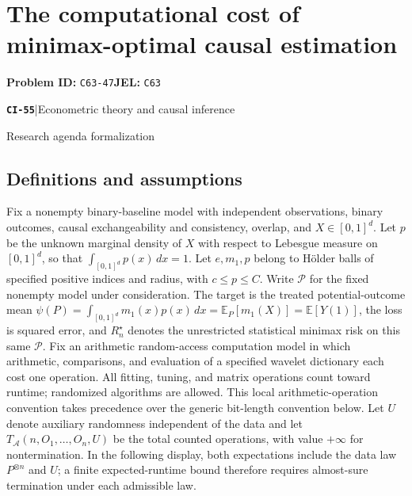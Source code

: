 \documentclass[11pt,a4paper]{article}
\newcommand{\E}{\mathbb E}
\newcommand{\entrymeta}[3]{{\sffamily\small\color{muted}\textbf{\texttt{#1}}\quad|\quad #2\par #3\par}}
\begin{document}
\section*{The computational cost of minimax-optimal causal estimation}
\textbf{Problem ID:} \texttt{C63-47}\quad \textbf{JEL:} \texttt{C63}\par
\label{problem:OP-0534}
\label{beyond:CI-55}
\entrymeta{CI-55}{Econometric theory and causal inference}{Research agenda formalization}
\subsection*{Definitions and assumptions}
Fix a nonempty binary-baseline model with independent observations, binary outcomes, causal exchangeability and consistency, overlap, and $X\in[0,1]^d$. Let $p$ be the unknown marginal density of $X$ with respect to Lebesgue measure on $[0,1]^d$, so that $\int_{[0,1]^d}p(x)\,dx=1$. Let $e,m_1,p$ belong to Hölder balls of specified positive indices and radius, with $c\leq p\leq C$. Write $\mathcal P$ for the fixed nonempty model under consideration. The target is the treated potential-outcome mean $\psi(P)=\int_{[0,1]^d}m_1(x)p(x)\,dx=\E_P[m_1(X)]=\E[Y(1)]$, the loss is squared error, and $R_n^\star$ denotes the unrestricted statistical minimax risk on this same $\mathcal P$. Fix an arithmetic random-access computation model in which arithmetic, comparisons, and evaluation of a specified wavelet dictionary each cost one operation. All fitting, tuning, and matrix operations count toward runtime; randomized algorithms are allowed. This local arithmetic-operation convention takes precedence over the generic bit-length convention below. Let $U$ denote auxiliary randomness independent of the data and let $T_{\mathcal A}(n,O_1,\ldots,O_n,U)$ be the total counted operations, with value $+\infty$ for nontermination. In the following display, both expectations include the data law $P^{\otimes n}$ and $U$; a finite expected-runtime bound therefore requires almost-sure termination under each admissible law.
\end{document}
